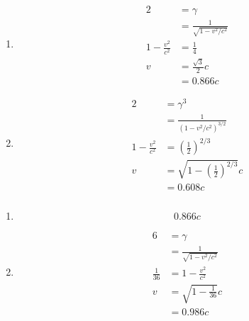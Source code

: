 \documentclass{article}
\begin{document}
\begin{enumerate}
  \item

        \begin{align*}
          2                   & = \gamma                         \\
                              & = \frac{1}{\sqrt{1 - v^2 / c^2}} \\
          1 - \frac{v^2}{c^2} & = \frac{1}{4}                    \\
          v                   & = \frac{\sqrt{3}}{2} c           \\
                              & = 0.866 c
        \end{align*}

  \item

        \begin{align*}
          2                   & = \gamma^3                                        \\
                              & = \frac{1}{(1 - v^2 / c^2)^{3 / 2}}               \\
          1 - \frac{v^2}{c^2} & = \left( \frac{1}{2} \right)^{2 / 3}              \\
          v                   & = \sqrt{1 - \left( \frac{1}{2} \right)^{2 / 3}} c \\
                              & = 0.608 c
        \end{align*}
\end{enumerate}

\setcounter{subsubsection}{30}
\subsubsection{}

\begin{enumerate}
  \item \[0.866 c\]

  \item

        \begin{align*}
          6            & = \gamma                         \\
                       & = \frac{1}{\sqrt{1 - v^2 / c^2}} \\
          \frac{1}{36} & = 1 - \frac{v^2}{c^2}            \\
          v            & = \sqrt{1 - \frac{1}{36}} c      \\
                       & = 0.986 c
        \end{align*}
\end{enumerate}
\end{document}
